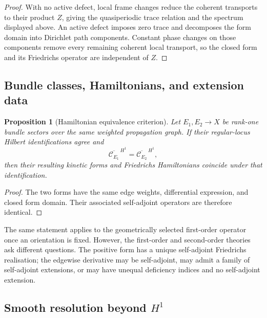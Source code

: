 \documentclass[11pt]{article}
\theoremstyle{plain}
\newtheorem{proposition}[theorem]{Proposition}
\theoremstyle{definition}
\begin{document}
\begin{proof}
With no active defect, local frame changes reduce the coherent transports to
their product \(Z\), giving the quasiperiodic trace relation and the spectrum
displayed above. An active defect imposes zero trace and decomposes the form
domain into Dirichlet path components. Constant phase changes on those
components remove every remaining coherent local transport, so the closed
form and its Friedrichs operator are independent of \(Z\).
\end{proof}

\subsection{Bundle classes, Hamiltonians, and extension data}
\label{subsec:bundle-not-operator}
\label{subsec:bundle-first-order-different}
\label{subsec:extension-not-bundle}



\begin{proposition}[Hamiltonian equivalence criterion]
\label{prop:bundle-Hamiltonian-equivalence}
Let \(E_1,E_2\to X\) be rank-one bundle sectors over the same weighted
propagation graph. If their regular-locus Hilbert identifications agree and
\[
  \overline{\mathcal C_{E_1}}^{\,H^1}
  =
  \overline{\mathcal C_{E_2}}^{\,H^1},
\]
then their resulting kinetic forms and Friedrichs Hamiltonians coincide
under that identification.
\end{proposition}

\begin{proof}
The two forms have the same edge weights, differential expression, and
closed form domain. Their associated self-adjoint operators are therefore
identical.
\end{proof}

The same statement applies to the geometrically selected first-order
operator once an orientation is fixed. However, the first-order and
second-order theories ask different questions. The positive form has a
unique self-adjoint Friedrichs realisation; the edgewise derivative may be
self-adjoint, may admit a family of self-adjoint extensions, or may have
unequal deficiency indices and no self-adjoint extension.



\subsection{\texorpdfstring{Smooth resolution beyond \(H^1\)}{Smooth resolution beyond H1}}
\label{subsec:smooth-data-beyond-graph}
\label{subsec:smooth-transported-jets}
\label{subsec:smooth-H1-universality}
\label{subsec:why-second-order-H1}
\end{document}
